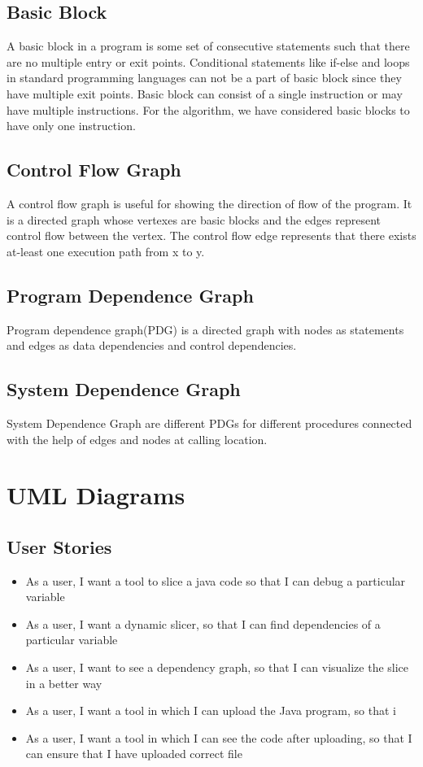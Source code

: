 \documentclass[conference]{IEEEtran}
\begin{document}
\subsection{Basic Block}
A basic block in a program is some set of consecutive statements such that there are no multiple entry or exit points. Conditional statements like if-else and loops in standard programming languages can not be a part of basic block since they have multiple exit points. Basic block can consist of a single instruction or may have multiple instructions. For the algorithm, we have considered basic blocks to have only one instruction.
\subsection{Control Flow Graph}
A control flow graph is useful for showing the direction of flow of the program. It is a directed graph whose vertexes are basic blocks and the edges represent control flow between the vertex. The control flow edge represents that there exists at-least one execution path from x to y.
\subsection{Program Dependence Graph}
Program dependence graph(PDG) is a directed graph with nodes as statements and edges as data dependencies and control dependencies. 
\subsection{System Dependence Graph}
System Dependence Graph are different PDGs for different procedures connected with the help of edges and nodes at calling location.

\section{UML Diagrams}
\subsection{User Stories }\label{AA}
\begin{itemize}
    \item As a user, I want a tool to slice a java code so that I can debug a particular variable
    \item As a user, I want a dynamic slicer, so that I can find dependencies of a particular variable
    \item As a user, I want to see a dependency graph, so that I can visualize the slice in a better way
    \item As a user, I want a tool in which I can upload the Java program, so that i
    \item As a user, I want a tool in which I can see the code after uploading, so that I can ensure that I have uploaded correct file
    \end{itemize}
\end{document}
